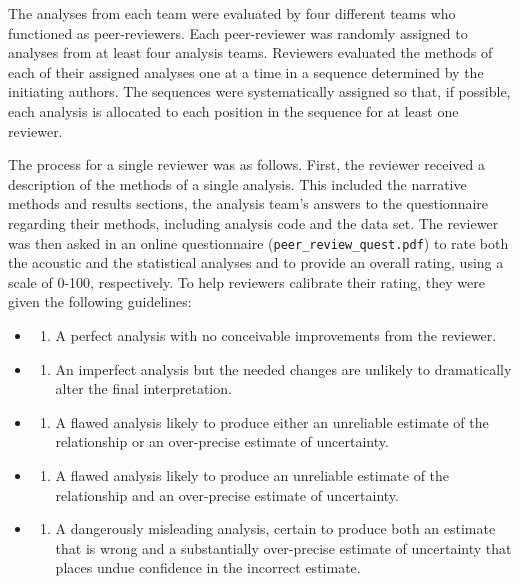 \documentclass[Review,times,sageh]{sagej}
\providecommand{\tightlist}{\setlength{\itemsep}{0pt}\setlength{\parskip}{0pt}}
\begin{document}
The analyses from each team were evaluated by four different teams who functioned as peer-reviewers.
Each peer-reviewer was randomly assigned to analyses from at least four analysis teams.
Reviewers evaluated the methods of each of their assigned analyses one at a time in a sequence determined by the initiating authors.
The sequences were systematically assigned so that, if possible, each analysis is allocated to each position in the sequence for at least one reviewer.

The process for a single reviewer was as follows.
First, the reviewer received a description of the methods of a single analysis.
This included the narrative methods and results sections, the analysis team's answers to the questionnaire regarding their methods, including analysis code and the data set.
The reviewer was then asked in an online questionnaire (\texttt{peer\_review\_quest.pdf}) to rate both the acoustic and the statistical analyses and to provide an overall rating, using a scale of 0-100, respectively.
To help reviewers calibrate their rating, they were given the following guidelines:

\begin{itemize}
\item
  \begin{enumerate}
  \def\labelenumi{\arabic{enumi}.}
  \setcounter{enumi}{99}
  \tightlist
  \item
    A perfect analysis with no conceivable improvements from the reviewer.
  \end{enumerate}
\item
  \begin{enumerate}
  \def\labelenumi{\arabic{enumi}.}
  \setcounter{enumi}{74}
  \tightlist
  \item
    An imperfect analysis but the needed changes are unlikely to dramatically alter the final interpretation.
  \end{enumerate}
\item
  \begin{enumerate}
  \def\labelenumi{\arabic{enumi}.}
  \setcounter{enumi}{49}
  \tightlist
  \item
    A flawed analysis likely to produce either an unreliable estimate of the relationship or an over-precise estimate of uncertainty.
  \end{enumerate}
\item
  \begin{enumerate}
  \def\labelenumi{\arabic{enumi}.}
  \setcounter{enumi}{24}
  \tightlist
  \item
    A flawed analysis likely to produce an unreliable estimate of the relationship and an over-precise estimate of uncertainty.
  \end{enumerate}
\item
  \begin{enumerate}
  \def\labelenumi{\arabic{enumi}.}
  \setcounter{enumi}{-1}
  \tightlist
  \item
    A dangerously misleading analysis, certain to produce both an estimate that is wrong and a substantially over-precise estimate of uncertainty that places undue confidence in the incorrect estimate.
  \end{enumerate}
\end{itemize}
\end{document}
